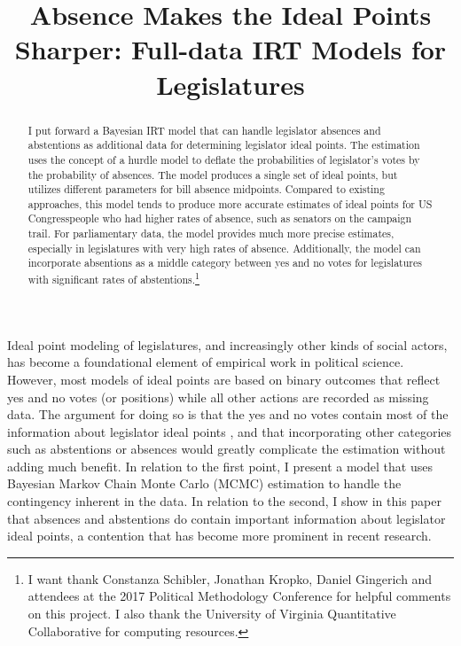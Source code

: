 %

\title{Absence Makes the Ideal Points Sharper: Full-data IRT Models for Legislatures}
\usepackage{amsmath,amsthm, amssymb, latexsym}
\linespread{1.5}

	
	\maketitle
	
	\begin{abstract}
		I put forward a Bayesian IRT model that can handle legislator absences and abstentions as additional data for determining legislator ideal points. The estimation uses the concept of a hurdle model to deflate the probabilities of legislator’s votes by the probability of absences. The model produces a single set of ideal points, but utilizes different parameters for bill absence midpoints. Compared to existing approaches, this model tends to produce more accurate estimates of ideal points for US Congresspeople who had higher rates of absence, such as senators on the campaign trail. For parliamentary data, the model provides much more precise estimates, especially in legislatures with very high rates of absence. Additionally, the model can incorporate absentions as a middle category between yes and no votes for legislatures with significant rates of abstentions.\footnote{I want thank Constanza Schibler, Jonathan Kropko, Daniel Gingerich and attendees at the 2017 Political Methodology Conference for helpful comments on this project. I also thank the University of Virginia Quantitative Collaborative for computing resources.}
	\end{abstract}
	
	Ideal point modeling of legislatures, and increasingly other kinds of social actors, has become a foundational element of empirical work in political science. However, most models of ideal points are based on binary outcomes that reflect yes and no votes (or positions) while all other actions are recorded as missing data. The argument for doing so is that the yes and no votes contain most of the information about legislator ideal points \parencite[4]{poole2008}, and that incorporating other categories such as abstentions or absences would greatly complicate the estimation without adding much benefit. In relation to the first point, I present a model that uses Bayesian Markov Chain Monte Carlo (MCMC) estimation to handle the contingency inherent in the data. In relation to the second, I show in this paper that absences and abstentions do contain important information about legislator ideal points, a contention that has become more prominent in recent research.
	
